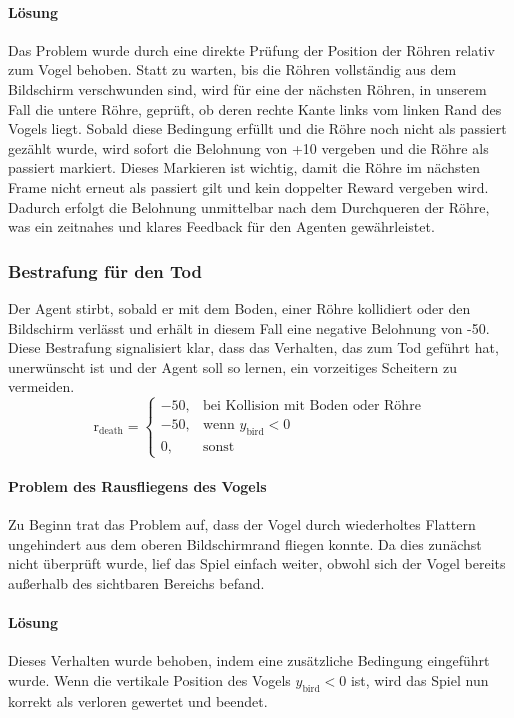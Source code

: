 \documentclass[conference]{IEEEtran}
\begin{document}
\paragraph{Lösung}
Das Problem wurde durch eine direkte Prüfung der Position der Röhren relativ zum Vogel behoben. Statt zu warten, bis die Röhren vollständig aus dem Bildschirm verschwunden sind, wird für eine der nächsten Röhren, in unserem Fall die untere Röhre, geprüft, ob deren rechte Kante links vom linken Rand des Vogels liegt. Sobald diese Bedingung erfüllt und die Röhre noch nicht als passiert gezählt wurde, wird sofort die Belohnung von +10 vergeben und die Röhre als passiert markiert. Dieses Markieren ist wichtig, damit die Röhre im nächsten Frame nicht erneut als passiert gilt und kein doppelter Reward vergeben wird. Dadurch erfolgt die Belohnung unmittelbar nach dem Durchqueren der Röhre, was ein zeitnahes und klares Feedback für den Agenten gewährleistet.\\

\subsubsection{Bestrafung für den Tod}\label{reward_design_third}
Der Agent stirbt, sobald er mit dem Boden, einer Röhre kollidiert oder den Bildschirm verlässt und erhält in diesem Fall eine negative Belohnung von -50. Diese Bestrafung signalisiert klar, dass das Verhalten, das zum Tod geführt hat, unerwünscht ist und der Agent soll so lernen, ein vorzeitiges Scheitern zu vermeiden.
\begin{equation}
	\text{r}_{\text{death}} =
	\begin{cases}
		-50, & \text{bei Kollision mit Boden oder Röhre} \\
		-50, & \text{wenn } y_{\text{bird}} < 0 \\
		0,    & \text{sonst}
	\end{cases}
\end{equation}

\paragraph{Problem des Rausfliegens des Vogels}
Zu Beginn trat das Problem auf, dass der Vogel durch wiederholtes Flattern ungehindert aus dem oberen Bildschirmrand fliegen konnte. Da dies zunächst nicht überprüft wurde, lief das Spiel einfach weiter, obwohl sich der Vogel bereits außerhalb des sichtbaren Bereichs befand. 

\paragraph{Lösung}
Dieses Verhalten wurde behoben, indem eine zusätzliche Bedingung eingeführt wurde. Wenn die vertikale Position des Vogels \( y_{\text{bird}} < 0 \) ist, wird das Spiel nun korrekt als verloren gewertet und beendet.
\end{document}
